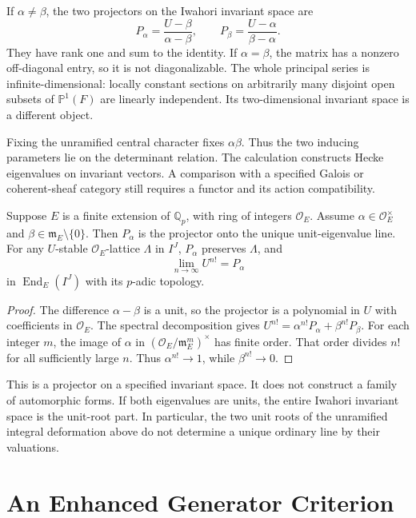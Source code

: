 If $\alpha\ne\beta$, the two projectors on the Iwahori invariant space are
\[
 P_\alpha=\frac{U-\beta}{\alpha-\beta},\qquad
 P_\beta=\frac{U-\alpha}{\beta-\alpha}.
\]
They have rank one and sum to the identity. If $\alpha=\beta$, the
matrix has a nonzero off-diagonal entry, so it is not diagonalizable.
The whole principal series is infinite-dimensional: locally constant
sections on arbitrarily many disjoint open subsets of $\mathbb P^1(F)$
are linearly independent. Its two-dimensional invariant space is a
different object.

Fixing the unramified central character fixes $\alpha\beta$.
Thus the two inducing parameters lie on the determinant relation.
The calculation constructs Hecke eigenvalues on invariant vectors.
A comparison with a specified Galois or coherent-sheaf category still
requires a functor and its action compatibility.

\begin{corollary}
\label{v4-arith:w5-e:local:ordinary-projector}
Suppose $E$ is a finite extension of $\mathbb Q_p$, with ring of
integers $\mathcal O_E$. Assume $\alpha\in\mathcal O_E^\times$
and $\beta\in\mathfrak m_E\setminus\{0\}$.
Then $P_\alpha$ is the projector onto the unique unit-eigenvalue line.
For any $U$-stable $\mathcal O_E$-lattice $\Lambda$ in $I^J$,
$P_\alpha$ preserves $\Lambda$, and
\[
 \lim_{n\to\infty}U^{n!}=P_\alpha
\]
in $\operatorname{End}_E(I^J)$ with its $p$-adic topology.
\end{corollary}

\begin{proof}
The difference $\alpha-\beta$ is a unit, so the projector is a
polynomial in $U$ with coefficients in $\mathcal O_E$.
The spectral decomposition gives
$U^{n!}=\alpha^{n!}P_\alpha+\beta^{n!}P_\beta$.
For each integer $m$, the image of $\alpha$ in
$(\mathcal O_E/\mathfrak m_E^m)^\times$ has finite order.
That order divides $n!$ for all sufficiently large $n$.
Thus $\alpha^{n!}\to1$, while $\beta^{n!}\to0$.
\end{proof}

This is a projector on a specified invariant space. It does not
construct a family of automorphic forms. If both eigenvalues are units,
the entire Iwahori invariant space is the unit-root part. In particular, the two unit
roots of the unramified integral deformation above do not determine
a unique ordinary line by their valuations.

\section{An Enhanced Generator Criterion}

